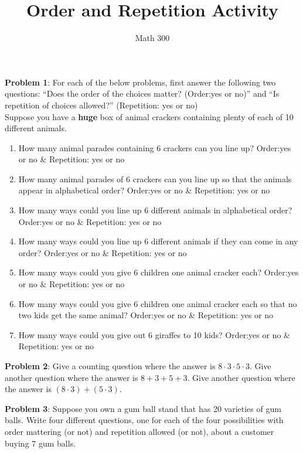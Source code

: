 \documentclass[11pt]{amsart}
\title{Order and Repetition Activity}
\author{Math 300}
\begin{document}
\maketitle


{\bf Problem 1}: For each of the below problems, first answer the following two questions:  ``Does the order of the choices matter? (Order:yes or no)''  and ``Is repetition of choices allowed?'' (Repetition: yes or no)\\

Suppose you have a {\bf huge} box of animal crackers containing plenty of each of 10 different animals. 

\begin{enumerate}
\item  How many animal parades containing 6 crackers can you line up? Order:yes or no \& Repetition: yes or no\\
\item How many animal parades of 6 crackers can you line up so that the animals appear in alphabetical order? Order:yes or no \& Repetition: yes or no\\
\item  How many ways could you line up 6 different animals in alphabetical order? Order:yes or no \& Repetition: yes or no\\
\item  How many ways could you line up 6 different animals if they can come in any order? Order:yes or no \& Repetition: yes or no\\
\item  How many ways could you give 6 children one animal cracker each? Order:yes or no \& Repetition: yes or no\\
\item  How many ways could you give 6 children one animal cracker each so that no two kids get the same animal? Order:yes or no \& Repetition: yes or no\\
\item  How many ways could you give out 6 giraffes to 10 kids? Order:yes or no \& Repetition: yes or no\\
\end{enumerate}

\pagebreak

{\bf Problem 2}: Give a counting question where the answer is $8 \cdot 3 \cdot 5 \cdot 3$. Give another question where the answer is $8 + 3 + 5 + 3$. Give another question where the answer is $(8 \cdot 3) + (5 \cdot 3)$. \vfill

{\bf Problem 3}: Suppose you own a gum ball stand that has 20 varieties of gum balls.  Write four different questions, one for each of the four possibilities with order mattering (or not) and repetition allowed (or not), about a customer buying 7 gum balls.\vfill
\end{document}
